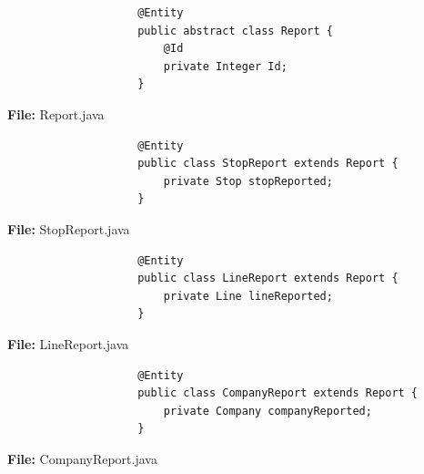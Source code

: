         \begin{framed}
            \begin{code}
                \begin{verbatim}
                    @Entity
                    public abstract class Report {
                        @Id 
                        private Integer Id;
                    }
                \end{verbatim}
                \caption{\textbf{File:} Report.java}
            \end{code}
        \end{framed}
        \begin{framed}
            \begin{code}
                \begin{verbatim}
                    @Entity
                    public class StopReport extends Report {        
                        private Stop stopReported;
                    }
                \end{verbatim}  
                \caption{\textbf{File:} StopReport.java}
            \end{code}
        \end{framed}
        \begin{framed}
            \begin{code}
                \begin{verbatim}
                    @Entity
                    public class LineReport extends Report {        
                        private Line lineReported;
                    }
                \end{verbatim}  
                \caption{\textbf{File:} LineReport.java}
            \end{code}
        \end{framed}
        \begin{framed}
            \begin{code}
                \begin{verbatim}
                    @Entity
                    public class CompanyReport extends Report {        
                        private Company companyReported;
                    }
                \end{verbatim}  
                \caption{\textbf{File:} CompanyReport.java}
            \end{code}
        \end{framed}
